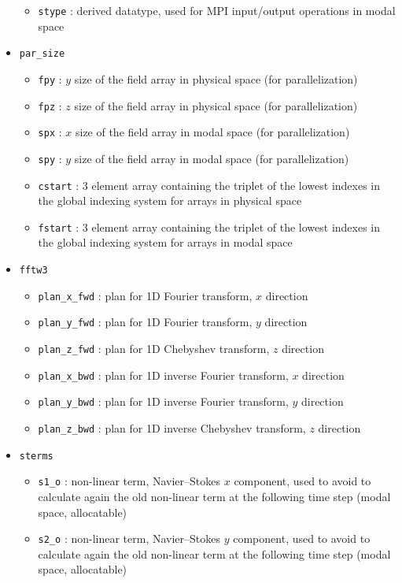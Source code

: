 \begin{itemize}
\begin{itemize}
\item \texttt{stype} : derived datatype, used for MPI input/output operations in modal space
\end{itemize}
\item \texttt{par\_size}
\begin{itemize}
\item \texttt{fpy} : $y$ size of the field array in physical space (for parallelization)
\item \texttt{fpz} : $z$ size of the field array in physical space (for parallelization)
\item \texttt{spx} : $x$ size of the field array in modal space (for parallelization)
\item \texttt{spy} : $y$ size of the field array in modal space (for parallelization)
\item \texttt{cstart} : 3 element array containing the triplet of the lowest indexes in the global indexing system for arrays in physical space
\item \texttt{fstart} : 3 element array containing the triplet of the lowest indexes in the global indexing system for arrays in modal space
\end{itemize}
\item \texttt{fftw3}
\begin{itemize}
\item \texttt{plan\_x\_fwd} : plan for 1D Fourier transform, $x$ direction
\item \texttt{plan\_y\_fwd} : plan for 1D Fourier transform, $y$ direction
\item \texttt{plan\_z\_fwd} : plan for 1D Chebyshev transform, $z$ direction
\item \texttt{plan\_x\_bwd} : plan for 1D inverse Fourier transform, $x$ direction
\item \texttt{plan\_y\_bwd} : plan for 1D inverse Fourier transform, $y$ direction
\item \texttt{plan\_z\_bwd} : plan for 1D inverse Chebyshev transform, $z$ direction
\end{itemize}
\item \texttt{sterms}
\begin{itemize}
\item \texttt{s1\_o} : non-linear term, Navier--Stokes $x$ component, used to avoid to calculate again the old non-linear term at the following time step (modal space, allocatable)
\item \texttt{s2\_o} : non-linear term, Navier--Stokes $y$ component, used to avoid to calculate again the old non-linear term at the following time step (modal space, allocatable)

\end{itemize}
\end{itemize}
